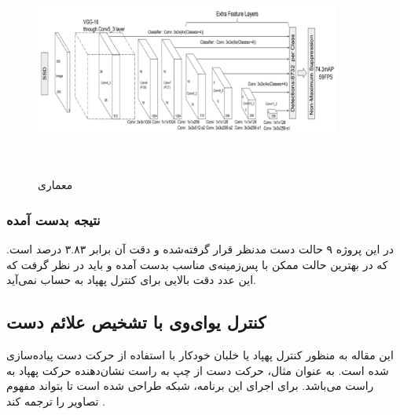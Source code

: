 \begin{figure}[h]
    \centering
    \includegraphics[height=7cm,width=0.9\textwidth]{VGG16.png}
    \caption[معماری ]{معماری \cite{hadri2018hand}}
\end{figure}

\subsubsection{نتیجه بدست آمده}
 در این پروژه ۹ حالت دست مدنظر قرار گرفته‌شده و دقت آن برابر ۳.۸۳ درصد است.
 که در بهترین حالت ممکن با پس‌زمینه‌ی مناسب بدست آمده و باید در نظر گرفت که این عدد دقت بالایی برای کنترل پهپاد به حساب نمی‌آید.


\subsection {کنترل یو‌ای‌وی با تشخيص علائم دست}
این مقاله به منظور کنترل پهپاد یا خلبان خودکار با استفاده از حرکت دست پیاده‌سازی شده است. به عنوان مثال، حرکت دست از چپ به راست نشان‌دهنده حرکت پهپاد به راست می‌باشد. 
برای اجرای این برنامه، شبکه  طراحی شده است تا بتواند مفهوم تصاویر را ترجمه کند \cite{perera2018uav}.

